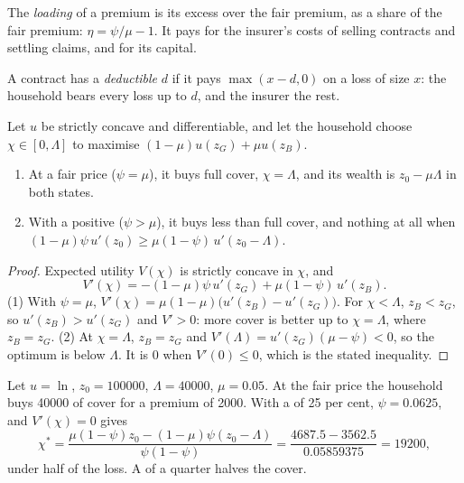 \begin{definition}[Loading]\label{def:b2:insurance-and-risk-sharing:loading}
The \emph{loading} of a premium is its excess over the fair premium, as a share of the
fair premium: $\eta = \psi/\mu - 1$. It pays for the insurer's costs of selling contracts and settling
claims, and for its capital.
\end{definition}

\begin{definition}[Deductible]\label{def:b2:insurance-and-risk-sharing:deductible}
A contract has a \emph{deductible} $d$ if it pays $\max(x - d, 0)$ on a loss of
size $x$: the household bears every loss up to $d$, and the insurer the rest.
\end{definition}

\begin{proposition}\label{prop:b2:insurance-and-risk-sharing:mossin}
Let $u$ be strictly concave and differentiable, and let the household choose $\chi \in [0, \Lambda]$
to maximise $(1 - \mu)u(z_G) + \mu u(z_B)$.
\begin{enumerate}
  \item At a fair price ($\psi = \mu$), it buys full cover, $\chi = \Lambda$, and its wealth is $z_0 -
        \mu\Lambda$ in both states.
  \item With a positive  ($\psi > \mu$), it buys less than full cover, and nothing at all when
        $(1 - \mu)\psi\,u'(z_0) \ge \mu(1 - \psi)\,u'(z_0 - \Lambda)$.
\end{enumerate}
\end{proposition}

\begin{proof}
Expected utility $V(\chi)$ is strictly concave in $\chi$, and
\[
V'(\chi) = -(1 - \mu)\psi\,u'(z_G) + \mu(1 - \psi)\,u'(z_B).
\]
(1) With $\psi = \mu$, $V'(\chi) = \mu(1 - \mu)\bigl(u'(z_B) - u'(z_G)\bigr)$. For $\chi < \Lambda$,
$z_B < z_G$, so $u'(z_B) > u'(z_G)$ and $V' > 0$: more cover is better up to $\chi = \Lambda$, where
$z_B = z_G$. (2) At $\chi = \Lambda$, $z_B = z_G$ and $V'(\Lambda) = u'(z_G)(\mu - \psi) < 0$, so the
optimum is below $\Lambda$. It is $0$ when $V'(0) \le 0$, which is the stated inequality.
\end{proof}

\begin{example}\label{ex:b2:insurance-and-risk-sharing:loading}
Let $u = \ln$, $z_0 = \num{100000}$, $\Lambda = \num{40000}$, $\mu = 0.05$. At the fair price the
household buys \num{40000} of cover for a premium of \num{2000}. With a  of 25 per cent,
$\psi = 0.0625$, and $V'(\chi) = 0$ gives
\[
\chi^{*} = \frac{\mu(1 - \psi)z_0 - (1 - \mu)\psi(z_0 - \Lambda)}{\psi(1 - \psi)} =
\frac{\num{4687.5} - \num{3562.5}}{\num{0.05859375}} = \num{19200},
\]
under half of the loss. A  of a quarter halves the cover.
\end{example}


